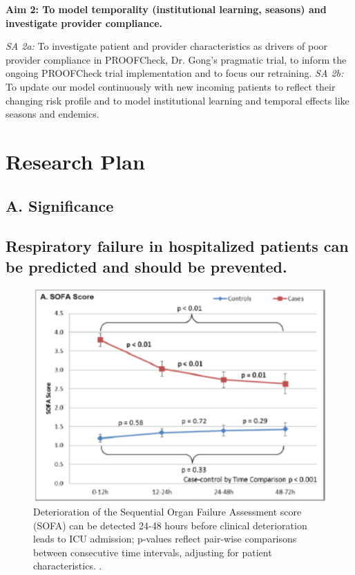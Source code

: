 \documentclass[11pt,notitlepage]{article}
\begin{document}
\begin{flushleft}
\textbf{Aim 2: To model temporality (institutional learning, seasons) and investigate provider compliance.}
\end{flushleft}
\vspace{-5pt}
\textit{SA 2a:} To investigate patient and provider characteristics as drivers of poor provider compliance in PROOFCheck, Dr. Gong's pragmatic trial, to inform the ongoing PROOFCheck trial implementation and to focus our retraining. 
\textit{SA 2b:} To update our model continuously with new incoming patients to reflect their changing risk profile and to model institutional learning and temporal effects like seasons and endemics. 
\section*{Research Plan}

\subsection*{A. Significance}

\subsection*{Respiratory failure in hospitalized patients can be predicted and should be prevented.} 

\begin{figure}
 \vspace{-10pt}
 \includegraphics[scale=0.7]{Figures/SOFA_fig.png}
  \vspace{-25pt}
  \caption{\footnotesize Deterioration of the Sequential Organ Failure Assessment score (SOFA) can be detected 24-48 hours before clinical deterioration leads to ICU admission; p-values reflect pair-wise comparisons between consecutive time intervals, adjusting for patient characteristics. \cite{Yu_24970344}.}
    \label{fig:SOFA_fig}
 \vspace{-15pt}
\end{figure}
\end{document}
